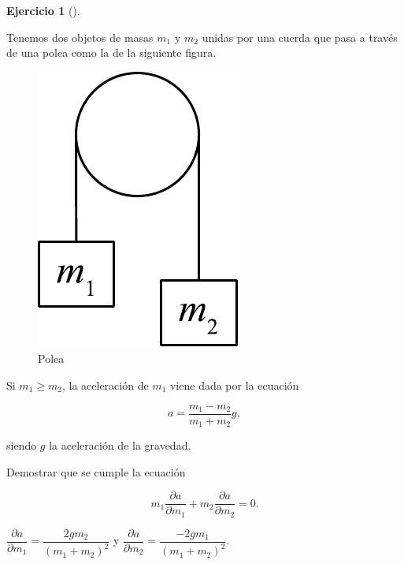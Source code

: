 \documentclass[
  a4paper,
]{scrreport}
\theoremstyle{definition}
\newtheorem{exercise}{Ejercicio}[chapter]
\theoremstyle{remark}
\begin{document}
\begin{exercise}[]\protect\hypertarget{exr-polea}{}\label{exr-polea}

Tenemos dos objetos de masas \(m_1\) y \(m_2\) unidas por una cuerda que
pasa a través de una polea como la de la siguiente figura.

\begin{figure}

{\centering \includegraphics{img/derivadas-funciones-varias-variables/polea.pdf}

}

\caption{Polea}

\end{figure}

Si \(m_1\geq m_2\), la aceleración de \(m_1\) viene dada por la ecuación

\[
a=\frac{m_1-m_2}{m_1+m_2}g,
\]

siendo \(g\) la aceleración de la gravedad.

Demostrar que se cumple la ecuación

\[
m_1\frac{\partial a}{\partial m_1}+m_2\frac{\partial a}{\partial m_2}=0.
\]

\end{exercise}

\begin{tcolorbox}[enhanced jigsaw, bottomrule=.15mm, breakable, colframe=quarto-callout-tip-color-frame, toprule=.15mm, opacityback=0, left=2mm, opacitybacktitle=0.6, colback=white, toptitle=1mm, titlerule=0mm, bottomtitle=1mm, arc=.35mm, title=\textcolor{quarto-callout-tip-color}{\faLightbulb}\hspace{0.5em}{Solución}, rightrule=.15mm, colbacktitle=quarto-callout-tip-color!10!white, leftrule=.75mm, coltitle=black]

\(\dfrac{\partial a}{\partial m_1} = \dfrac{2gm_2}{(m_1+m_2)^2}\) y
\(\dfrac{\partial a}{\partial m_2} = \dfrac{-2gm_1}{(m_1+m_2)^2}\).

\end{tcolorbox}
\end{document}
